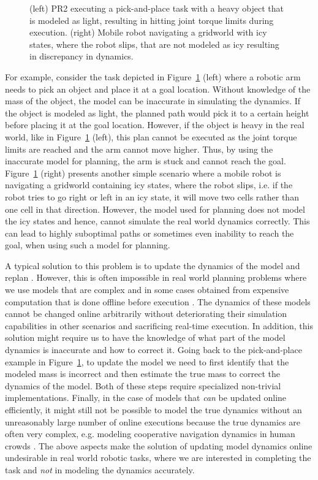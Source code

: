 \begin{figure}[t]
\begin{subfigure}{.4\columnwidth}
  \end{subfigure}  
  \caption{(left) PR2 executing a pick-and-place task with a heavy
    object that is modeled as light, resulting in hitting joint torque
    limits during execution. (right) Mobile
    robot navigating a gridworld with icy states, where the robot slips, that are not modeled
    as icy resulting in discrepancy in dynamics.}
  \label{fig:intro}
  
\end{figure}

For example, consider the task depicted in Figure~\ref{fig:intro}
(left) where a robotic arm needs to pick an object and place it at a
goal location. Without knowledge of the mass of the object, the model
can be inaccurate in simulating the dynamics. If the object is modeled
as light, the planned 
path would pick it to a certain height before placing it at the
goal location. However, if the object is heavy in the real world, like
in Figure~\ref{fig:intro} (left), this plan cannot be executed as the
joint torque limits are reached and the arm cannot move higher. Thus, by
using the inaccurate model for planning, the arm is stuck and cannot reach the
goal. Figure~\ref{fig:intro} (right) presents another simple scenario
where a mobile robot is navigating a gridworld containing icy
states, where the robot slips, i.e.
if the robot tries to go right or left in an icy state, it will move two cells rather
than one cell in that direction. However, the model used for planning
does not model the icy states and hence, cannot
simulate the real world dynamics correctly. This can lead to highly
suboptimal paths or sometimes even inability to reach the goal, when using such a model for planning.

A typical solution to this problem is to update the dynamics of the
model and replan \cite{DBLP:journals/sigart/Sutton91}. However, this
is often impossible in real world planning problems 
where we use models that are complex and in some cases obtained from
expensive computation that is done offline before execution
\cite{DBLP:conf/wafr/HauserBHL06}. The
dynamics of these models cannot be changed online arbitrarily without
deteriorating their simulation capabilities in other scenarios and sacrificing
real-time execution. In addition, this solution might require us to have
the knowledge of what part of the model dynamics is inaccurate and
how to correct it. Going
back to the pick-and-place example in Figure~\ref{fig:intro}, to
update the model we need to first identify
that the modeled mass is incorrect and then estimate the true mass to
correct the dynamics of the model. Both of these steps require
specialized non-trivial implementations. Finally, in the case of models that
\emph{can} be updated online efficiently, it might still not be possible to
model the true dynamics without an unreasonably large number of online
executions because the true dynamics are
often very complex, e.g. modeling cooperative navigation dynamics in
human crowds \cite{DBLP:conf/icra/VemulaMO17}. The above aspects make the 
solution of updating model dynamics online undesirable in real world robotic
tasks, where we are interested in completing the task and \emph{not} in
modeling the dynamics accurately.

